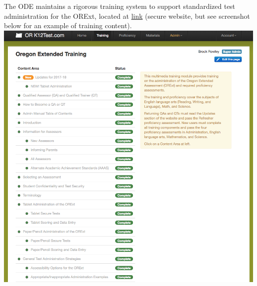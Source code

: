 \documentclass[]{article}
\begin{document}
The ODE maintains a rigorous training system to support standardized
test administration for the ORExt, located at \color{link}
\href{https://or.k12test.com}{link}\color{black} (secure website, but
see screenshot below for an example of training content). \FloatBarrier
\includegraphics{Figures/TrainingSite/TrainingSite.png}
\end{document}
